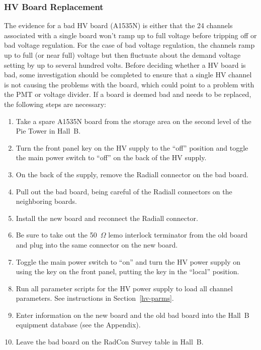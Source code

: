 \documentclass[12pt]{article}
\begin{document}
\subsubsection{HV Board Replacement}
\label{board-swap}

The evidence for a bad HV board (A1535N) is either that the 24 channels associated with a single 
board won't ramp up to full voltage before tripping off or bad voltage regulation. For the case
of bad voltage regulation, the channels ramp up to full (or near full) voltage but then fluctuate 
about the demand voltage setting by up to several hundred volts. Before deciding whether a HV 
board is bad, some investigation should be completed to ensure that a single HV channel is not 
causing the problems with the board, which could point to a problem with the PMT or voltage 
divider. If a board is deemed bad and needs to be replaced, the following steps are necessary:

\begin{enumerate}
\item Take a spare A1535N board from the storage area on the second level of the Pie Tower in Hall~B.
\item Turn the front panel key on the HV supply to the ``off'' position and toggle the main power 
switch to ``off'' on the back of the HV supply.
\item On the back of the supply, remove the Radiall connector on the bad board.
\item Pull out the bad board, being careful of the Radiall connectors on the neighboring boards.
\item Install the new board and reconnect the Radiall connector.
\item Be sure to take out the 50~$\Omega$ lemo interlock terminator from the old board and plug into
the same connector on the new board.
\item Toggle the main power switch to ``on'' and turn the HV power supply on using the key on the front 
panel, putting the key in the ``local'' position.
\item Run all parameter scripts for the HV power supply to load all channel parameters. See instructions
in Section~\ref{hv-parms}.
\item Enter information on the new board and the old bad board into the Hall~B equipment database (see
the Appendix).
\item Leave the bad board on the RadCon Survey table in Hall~B.
\end{enumerate}
\end{document}
